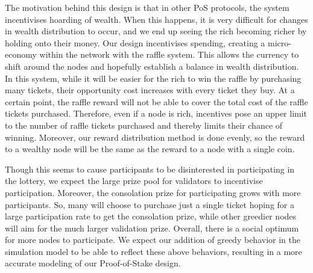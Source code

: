 The motivation behind this design is that in other PoS protocols, the system incentivises hoarding of wealth. When this happens, it is very difficult for changes in wealth distribution to occur, and we end up seeing the rich becoming richer by holding onto their money. Our design incentivises spending, creating a micro-economy within the network with the raffle system. This allows the currency to shift around the nodes and hopefully establish a balance in wealth distribution. In this system, while it will be easier for the rich to win the raffle by purchasing many tickets, their opportunity cost increases with every ticket they buy. At a certain point, the raffle reward will not be able to cover the total cost of the raffle tickets purchased. Therefore, even if a node is rich, incentives pose an upper limit to the number of raffle tickets purchased and thereby limits their chance of winning. Moreover, our reward distribution method is done evenly, so the reward to a wealthy node will be the same as the reward to a node with a single coin.

Though this seems to cause participants to be disinterested in participating in the lottery, we expect the large prize pool for validators to incentivise participation. Moreover, the consolation prize for participating grows with more participants. So, many will choose to purchase just a single ticket hoping for a large participation rate to get the consolation prize, while other greedier nodes will aim for the much larger validation prize. Overall, there is a social optimum for more nodes to participate. We expect our addition of greedy behavior in the simulation model to be able to reflect these above behaviors, resulting in a more accurate modeling of our Proof-of-Stake design.
